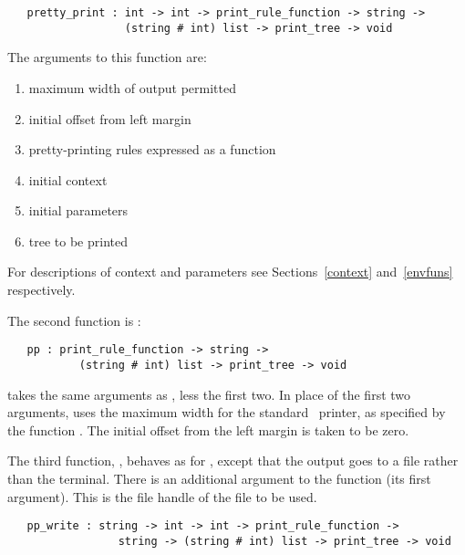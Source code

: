 \begin{boxed}\begin{verbatim}
   pretty_print : int -> int -> print_rule_function -> string ->
                  (string # int) list -> print_tree -> void
\end{verbatim}\end{boxed}

\noindent
The arguments to this function are:

\begin{enumerate}
\item{maximum width of output permitted}
\item{initial offset from left margin}
\item{pretty-printing rules expressed as a function}
\item{initial context}
\item{initial parameters}
\item{tree to be printed}
\end{enumerate}

\noindent
For descriptions of context and parameters see Sections~\ref{context}
and~\ref{envfuns} respectively.

The second function is :

\begin{boxed}\begin{verbatim}
   pp : print_rule_function -> string ->
           (string # int) list -> print_tree -> void
\end{verbatim}\end{boxed}

\noindent
{} takes the same arguments as , less the first two.
In place of the first two arguments,  uses the maximum width for the
standard \HOL\ printer, as specified by the function . The
initial offset from the left margin is taken to be zero.

The third function, , behaves as for ,
except that the output goes to a file rather than the terminal. There is an
additional argument to the function (its first argument). This is the file
handle of the file to be used.

\begin{boxed}\begin{verbatim}
   pp_write : string -> int -> int -> print_rule_function ->
                 string -> (string # int) list -> print_tree -> void
\end{verbatim}\end{boxed}


